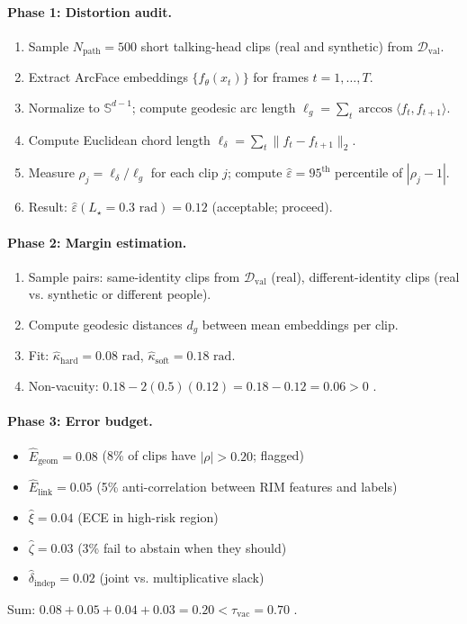 \documentclass[11pt]{article}
\begin{document}
\paragraph{Phase 1: Distortion audit.}
\begin{enumerate}[label=\arabic*.,leftmargin=*]
  \item Sample $N_{\mathrm{path}} = 500$ short talking-head clips (real and synthetic) from $\mathcal{D}_{\mathrm{val}}$.
  \item Extract ArcFace embeddings $\{f_\theta(x_t)\}$ for frames $t=1,\dots,T$.
  \item Normalize to $\mathbb{S}^{d-1}$; compute geodesic arc length $\ell_g = \sum_t \arccos\langle f_t, f_{t+1}\rangle$.
  \item Compute Euclidean chord length $\ell_\delta = \sum_t \|f_t - f_{t+1}\|_2$.
  \item Measure $\rho_j = \ell_\delta / \ell_g$ for each clip $j$; compute $\hat\varepsilon = 95^{\text{th}}$ percentile of $|\rho_j - 1|$.
  \item Result: $\hat\varepsilon(L_\star=0.3\text{ rad}) = 0.12$ (acceptable; proceed).
\end{enumerate}

\paragraph{Phase 2: Margin estimation.}
\begin{enumerate}[label=\arabic*.,leftmargin=*]
  \item Sample pairs: same-identity clips from $\mathcal{D}_{\mathrm{val}}$ (real), different-identity clips (real vs. synthetic or different people).
  \item Compute geodesic distances $d_g$ between mean embeddings per clip.
  \item Fit: $\hat\kappa_{\mathrm{hard}} = 0.08\text{ rad}$, $\hat\kappa_{\mathrm{soft}} = 0.18\text{ rad}$.
  \item Non-vacuity: $0.18 - 2(0.5)(0.12) = 0.18 - 0.12 = 0.06 > 0$ .
\end{enumerate}

\paragraph{Phase 3: Error budget.}
\begin{itemize}[leftmargin=*]
  \item $\hat E_{\mathrm{geom}} = 0.08$ (8\% of clips have $|\rho| > 0.20$; flagged)
  \item $\hat E_{\mathrm{link}} = 0.05$ (5\% anti-correlation between RIM features and labels)
  \item $\hat\xi = 0.04$ (ECE in high-risk region)
  \item $\hat\zeta = 0.03$ (3\% fail to abstain when they should)
  \item $\hat\delta_{\mathrm{indep}} = 0.02$ (joint vs. multiplicative slack)
\end{itemize}
Sum: $0.08 + 0.05 + 0.04 + 0.03 = 0.20 < \tau_{\mathrm{vac}} = 0.70$ .
\end{document}
